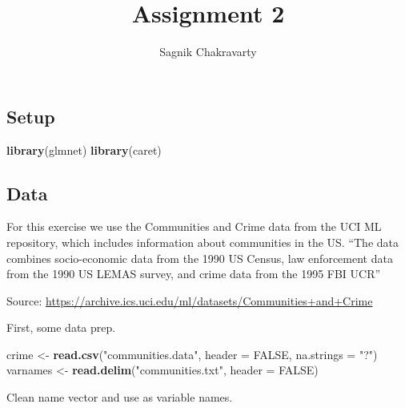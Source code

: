 \documentclass[
]{article}
\title{Assignment 2}
\author{Sagnik Chakravarty}
\date{}
\newenvironment{Shaded}{\begin{snugshade}}{\end{snugshade}}
\newcommand{\AttributeTok}[1]{\textcolor[rgb]{0.13,0.29,0.53}{#1}}
\newcommand{\ConstantTok}[1]{\textcolor[rgb]{0.56,0.35,0.01}{#1}}
\newcommand{\FunctionTok}[1]{\textcolor[rgb]{0.13,0.29,0.53}{\textbf{#1}}}
\newcommand{\NormalTok}[1]{#1}
\newcommand{\OtherTok}[1]{\textcolor[rgb]{0.56,0.35,0.01}{#1}}
\newcommand{\SpecialCharTok}[1]{\textcolor[rgb]{0.81,0.36,0.00}{\textbf{#1}}}
\newcommand{\StringTok}[1]{\textcolor[rgb]{0.31,0.60,0.02}{#1}}
\begin{document}
\maketitle

\hypertarget{setup}{%
\subsection{Setup}\label{setup}}

\begin{Shaded}
\begin{Highlighting}[]
\FunctionTok{library}\NormalTok{(glmnet)}
\FunctionTok{library}\NormalTok{(caret)}
\end{Highlighting}
\end{Shaded}

\hypertarget{data}{%
\subsection{Data}\label{data}}

For this exercise we use the Communities and Crime data from the UCI ML
repository, which includes information about communities in the US.
``The data combines socio-economic data from the 1990 US Census, law
enforcement data from the 1990 US LEMAS survey, and crime data from the
1995 FBI UCR''

Source:
\url{https://archive.ics.uci.edu/ml/datasets/Communities+and+Crime}

First, some data prep.

\begin{Shaded}
\begin{Highlighting}[]
\NormalTok{crime }\OtherTok{\textless{}{-}} \FunctionTok{read.csv}\NormalTok{(}\StringTok{"communities.data"}\NormalTok{, }\AttributeTok{header =} \ConstantTok{FALSE}\NormalTok{, }\AttributeTok{na.strings =} \StringTok{"?"}\NormalTok{)}
\NormalTok{varnames }\OtherTok{\textless{}{-}} \FunctionTok{read.delim}\NormalTok{(}\StringTok{"communities.txt"}\NormalTok{, }\AttributeTok{header =} \ConstantTok{FALSE}\NormalTok{)}
\end{Highlighting}
\end{Shaded}

Clean name vector and use as variable names.

\begin{Shaded}
\end{Shaded}
\end{document}
